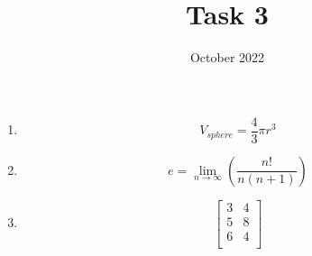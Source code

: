 \documentclass{article}
\title{Task 3}
\date{October 2022}
\begin{document}
\begin{enumerate}
    \item $$ V_{sphere} = \frac{4}{3} \pi r^3 $$
    \item $$e = \lim_{n \to \infty} \left( \frac{n!} {n (n + 1)} \right)$$
    \item $$\begin{bmatrix}
            3 & 4 \\
            5 & 8 \\
            6 & 4 \\
            \end{bmatrix}$$
\end{enumerate}
\end{document}
